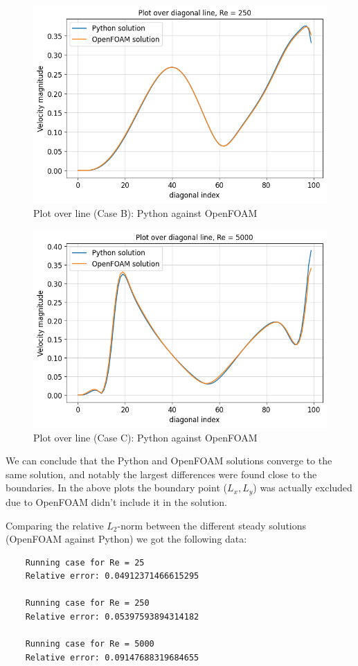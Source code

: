 \documentclass[10pt]{report}
\begin{document}
\begin{figure}[H]
    \centering
    \includegraphics[width = \textwidth]{plots/overline_RE250.png}
    \caption{Plot over line (Case B): Python against OpenFOAM}
\end{figure}
\begin{figure}[H]
    \centering
    \includegraphics[width = \textwidth]{plots/overline_RE5000.png}
    \caption{Plot over line (Case C): Python against OpenFOAM}
\end{figure}
We can conclude that the Python and OpenFOAM solutions converge to the same solution, and notably the largest differences were found close to
the boundaries. In the above plots the boundary point ($L_x,L_y$) was actually excluded due to OpenFOAM didn't include it in the solution.

Comparing the relative $L_2$-norm between the different steady solutions (OpenFOAM against Python) we got the following data:
\begin{lstlisting}
    Running case for Re = 25
    Relative error: 0.04912371466615295

    Running case for Re = 250
    Relative error: 0.05397593894314182

    Running case for Re = 5000
    Relative error: 0.09147688319684655
\end{lstlisting}
\end{document}
